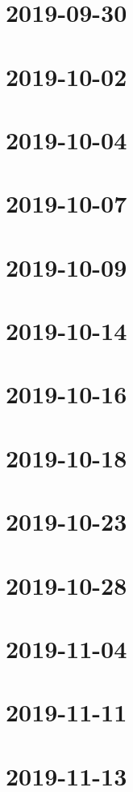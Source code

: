 \documentclass{book}
\begin{document}
\chapter{2019-09-30}
 

\chapter{2019-10-02}


\chapter{2019-10-04}


\chapter{2019-10-07}


\chapter{2019-10-09}


\chapter{2019-10-14}


\chapter{2019-10-16}


\chapter{2019-10-18}


\chapter{2019-10-23}


\chapter{2019-10-28}


\chapter{2019-11-04}


\chapter{}


\chapter{2019-11-11}


\chapter{2019-11-13}

\end{document}
